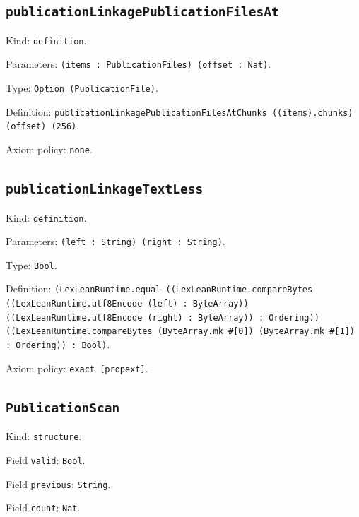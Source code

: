 \documentclass[11pt]{article}
\begin{document}
\subsection*{\texttt{publicationLinkagePublicationFilesAt}}
\noindent Kind: \texttt{definition}.\par
\noindent Parameters: \texttt{(items : PublicationFiles) (offset : Nat)}.\par
\noindent Type: \texttt{Option (PublicationFile)}.\par
\noindent Definition: \texttt{publicationLinkagePublicationFilesAtChunks ((items).chunks) (offset) (256)}.\par
\noindent Axiom policy: \texttt{none}.\par
\subsection*{\texttt{publicationLinkageTextLess}}
\noindent Kind: \texttt{definition}.\par
\noindent Parameters: \texttt{(left : String) (right : String)}.\par
\noindent Type: \texttt{Bool}.\par
\noindent Definition: \texttt{(LexLeanRuntime.equal ((LexLeanRuntime.compareBytes ((LexLeanRuntime.utf8Encode (left) : ByteArray)) ((LexLeanRuntime.utf8Encode (right) : ByteArray)) : Ordering)) ((LexLeanRuntime.compareBytes (ByteArray.mk \#[0]) (ByteArray.mk \#[1]) : Ordering)) : Bool)}.\par
\noindent Axiom policy: \texttt{exact [propext]}.\par
\subsection*{\texttt{PublicationScan}}
\noindent Kind: \texttt{structure}.\par
\noindent Field \texttt{valid}: \texttt{Bool}.\par
\noindent Field \texttt{previous}: \texttt{String}.\par
\noindent Field \texttt{count}: \texttt{Nat}.\par
\end{document}
